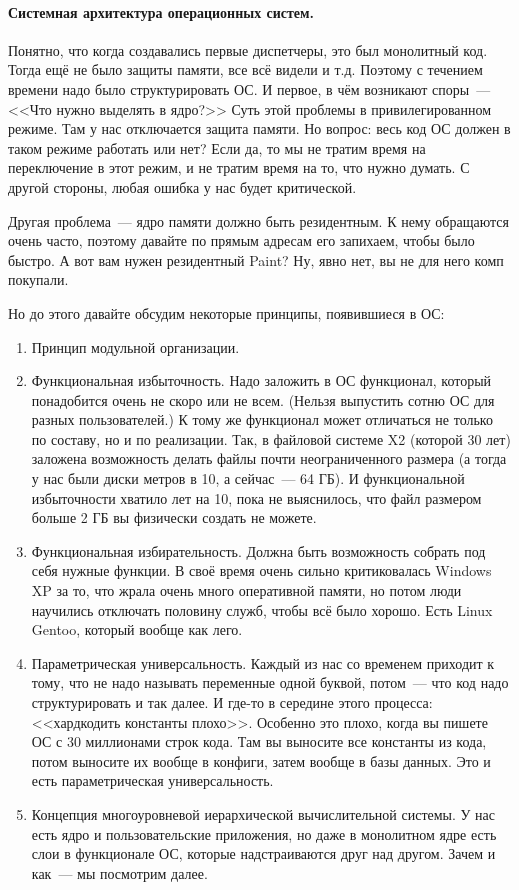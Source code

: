 \documentclass{article}
\begin{document}
    \paragraph{Системная архитектура операционных систем.}
    Понятно, что когда создавались первые диспетчеры, это был монолитный код. Тогда ещё не было защиты памяти, все всё видели и т.д. Поэтому с течением времени надо было структурировать ОС. И первое, в чём возникают споры~--- <<Что нужно выделять в ядро?>> Суть этой проблемы в привилегированном режиме. Там у нас отключается защита памяти. Но вопрос: весь код ОС должен в таком режиме работать или нет? Если да, то мы не тратим время на переключение в этот режим, и не тратим время на то, что нужно думать. С другой стороны, любая ошибка у нас будет критической.
    
    Другая проблема~--- ядро памяти должно быть резидентным. К нему обращаются очень часто, поэтому давайте по прямым адресам его запихаем, чтобы было быстро. А вот вам нужен резидентный Paint? Ну, явно нет, вы не для него комп покупали.
    
    Но до этого давайте обсудим некоторые принципы, появившиеся в ОС:
    \begin{enumerate}
        \item Принцип модульной организации.
        \item Функциональная избыточность. Надо заложить в ОС функционал, который понадобится очень не скоро или не всем. (Нельзя выпустить сотню ОС для разных пользователей.) К тому же функционал может отличаться не только по составу, но и по реализации. Так, в файловой системе X2 (которой 30 лет) заложена возможность делать файлы почти неограниченного размера (а тогда у нас были диски метров в 10, а сейчас~--- 64 ГБ). И функциональной избыточности хватило лет на 10, пока не выяснилось, что файл размером больше 2 ГБ вы физически создать не можете.
        
        \item Функциональная избирательность. Должна быть возможность собрать под себя нужные функции. В своё время очень сильно критиковалась Windows XP за то, что жрала очень много оперативной памяти, но потом люди научились отключать половину служб, чтобы всё было хорошо. Есть Linux Gentoo, который вообще как лего.
        
        \item Параметрическая универсальность. Каждый из нас со временем приходит к тому, что не надо называть переменные одной буквой, потом~--- что код надо структурировать и так далее. И где-то в середине этого процесса: <<хардкодить константы плохо>>. Особенно это плохо, когда вы пишете ОС с 30 миллионами строк кода. Там вы выносите все константы из кода, потом выносите их вообще в конфиги, затем вообще в базы данных. Это и есть параметрическая универсальность.
        
        \item Концепция многоуровневой иерархической вычислительной системы. У нас есть ядро и пользовательские приложения, но даже в монолитном ядре есть слои в функционале ОС, которые надстраиваются друг над другом. Зачем и как~--- мы посмотрим далее.
    \end{enumerate}
\end{document}
